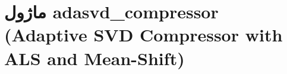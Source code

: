 \section{ماژول adasvd\_compressor (Adaptive SVD Compressor with ALS and Mean-Shift)}
\label{sec:module_adasvd_compressor}
